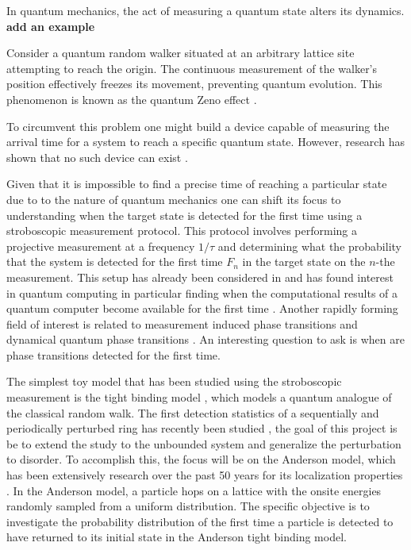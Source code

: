 \documentclass[12pt]{article}
\numberwithin{equation}{section}
\newcommand{\1}{\mathbb{1}}
\begin{document}
In quantum mechanics, the act of measuring a quantum state alters its dynamics. 
\textbf{add an example}

Consider a quantum random walker situated at an arbitrary lattice site attempting to reach the origin. The continuous measurement of the walker's position effectively freezes its movement, preventing quantum evolution. This phenomenon is known as the quantum Zeno effect \cite{zeno}.

To circumvent this problem one might build a device capable of measuring the arrival time for a system to reach a specific quantum state. However, research has shown that no such device can exist \cite{arrival_time}.

Given that it is impossible to find a precise time of reaching a particular state due to to the nature of quantum mechanics one can shift its focus to understanding when the target state is detected for the first time using a stroboscopic measurement protocol. This protocol involves performing a projective measurement at a frequency $1/\tau$ and determining what the probability that the system is detected for the first time $F_n$ in the target state on the $n$-the measurement. This setup has already been considered in \cite{grunbaum_recurrence_2013,krovi_hitting_2006,dhar_quantum_2015} and has found interest in quantum computing in particular finding when the computational results of a quantum computer become available for the first time \cite{grover_quantum_1997,noauthor_one-dimensional_nodate,aaronson_quantum_2005}. Another rapidly forming field of interest is related to measurement induced phase transitions \cite{Skinner_2019} and dynamical quantum phase transitions \cite{Heyl_2018}. An interesting question to ask is when are phase transitions detected for the first time.

The simplest toy model that has been studied using the stroboscopic measurement is the tight binding model \cite{barkai}, which models a quantum analogue of the classical random walk. The first detection statistics of a sequentially and periodically perturbed ring has recently been studied \cite{wang2023quantum}, the goal of this project is be to extend the study to the unbounded system and generalize the perturbation to disorder. To accomplish this, the focus will be on the Anderson model, which has been extensively research over the past 50 years for its localization properties \cite{50_localization}. In the Anderson model, a particle hops on a lattice with the onsite energies randomly sampled from a uniform distribution.
The specific objective is to investigate the probability distribution of the first time a particle is detected to have returned to its initial state in the Anderson tight binding model. 
\end{document}

